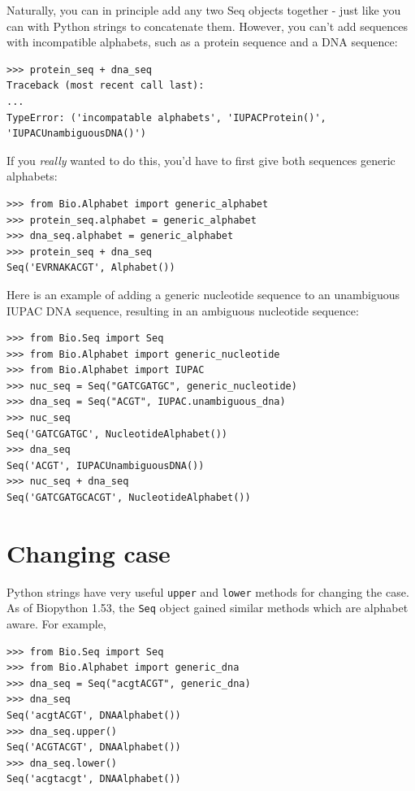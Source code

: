 \documentclass{report}
\begin{document}
Naturally, you can in principle add any two Seq objects together - just like you can with Python strings to concatenate them.  However, you can't add sequences with incompatible alphabets, such as a protein sequence and a DNA sequence:

\begin{verbatim}
>>> protein_seq + dna_seq
Traceback (most recent call last):
...
TypeError: ('incompatable alphabets', 'IUPACProtein()', 'IUPACUnambiguousDNA()')
\end{verbatim}

If you \emph{really} wanted to do this, you'd have to first give both sequences generic alphabets:

\begin{verbatim}
>>> from Bio.Alphabet import generic_alphabet
>>> protein_seq.alphabet = generic_alphabet
>>> dna_seq.alphabet = generic_alphabet
>>> protein_seq + dna_seq
Seq('EVRNAKACGT', Alphabet())
\end{verbatim}

Here is an example of adding a generic nucleotide sequence to an unambiguous IUPAC DNA sequence, resulting in an ambiguous nucleotide sequence:

\begin{verbatim}
>>> from Bio.Seq import Seq
>>> from Bio.Alphabet import generic_nucleotide
>>> from Bio.Alphabet import IUPAC
>>> nuc_seq = Seq("GATCGATGC", generic_nucleotide)
>>> dna_seq = Seq("ACGT", IUPAC.unambiguous_dna)
>>> nuc_seq
Seq('GATCGATGC', NucleotideAlphabet())
>>> dna_seq
Seq('ACGT', IUPACUnambiguousDNA())
>>> nuc_seq + dna_seq
Seq('GATCGATGCACGT', NucleotideAlphabet())
\end{verbatim}

\section{Changing case}

Python strings have very useful \verb|upper| and \verb|lower| methods for changing the case.
As of Biopython 1.53, the \verb|Seq| object gained similar methods which are alphabet aware.
For example,

\begin{verbatim}
>>> from Bio.Seq import Seq
>>> from Bio.Alphabet import generic_dna
>>> dna_seq = Seq("acgtACGT", generic_dna)
>>> dna_seq
Seq('acgtACGT', DNAAlphabet())
>>> dna_seq.upper()
Seq('ACGTACGT', DNAAlphabet())
>>> dna_seq.lower()
Seq('acgtacgt', DNAAlphabet())
\end{verbatim}
\end{document}
